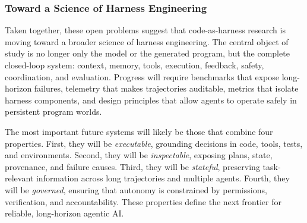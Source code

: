 \documentclass{llmxive}
\begin{document}
\subsubsection{Toward a Science of Harness Engineering}

Taken together, these open problems suggest that code-as-harness research is moving toward a broader science of harness engineering. The central object of study is no longer only the model or the generated program, but the complete closed-loop system: context, memory, tools, execution, feedback, safety, coordination, and evaluation. Progress will require benchmarks that expose long-horizon failures, telemetry that makes trajectories auditable, metrics that isolate harness components, and design principles that allow agents to operate safely in persistent program worlds.

The most important future systems will likely be those that combine four properties. First, they will be \emph{executable}, grounding decisions in code, tools, tests, and environments. Second, they will be \emph{inspectable}, exposing plans, state, provenance, and failure causes. Third, they will be \emph{stateful}, preserving task-relevant information across long trajectories and multiple agents. Fourth, they will be \emph{governed}, ensuring that autonomy is constrained by permissions, verification, and accountability. These properties define the next frontier for reliable, long-horizon agentic AI.











\vfill
\end{document}
